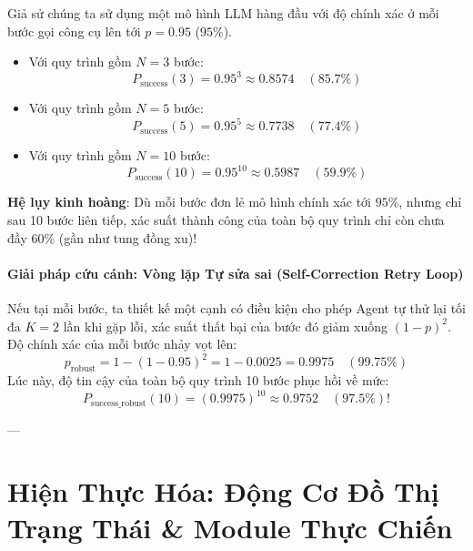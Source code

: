 \begin{example}
Giả sử chúng ta sử dụng một mô hình LLM hàng đầu với độ chính xác ở mỗi bước gọi công cụ lên tới $p = 0.95$ ($95\%$).
\begin{itemize}
  \item Với quy trình gồm $N = 3$ bước:
  \begin{equation*}
  P_{\text{success}}(3) = 0.95^3 \approx 0.8574 \quad (\mathbf{85.7\%})
  \end{equation*}
  \item Với quy trình gồm $N = 5$ bước:
  \begin{equation*}
  P_{\text{success}}(5) = 0.95^5 \approx 0.7738 \quad (\mathbf{77.4\%})
  \end{equation*}
  \item Với quy trình gồm $N = 10$ bước:
  \begin{equation*}
  P_{\text{success}}(10) = 0.95^{10} \approx 0.5987 \quad (\mathbf{59.9\%})
  \end{equation*}
\end{itemize}
\textbf{Hệ lụy kinh hoàng}: Dù mỗi bước đơn lẻ mô hình chính xác tới $95\%$, nhưng chỉ sau 10 bước liên tiếp, xác suất thành công của toàn bộ quy trình chỉ còn chưa đầy $60\%$ (gần như tung đồng xu)!

\paragraph{Giải pháp cứu cánh: Vòng lặp Tự sửa sai (Self-Correction Retry Loop)}
Nếu tại mỗi bước, ta thiết kế một cạnh có điều kiện cho phép Agent tự thử lại tối đa $K = 2$ lần khi gặp lỗi, xác suất thất bại của bước đó giảm xuống $(1 - p)^2$.
Độ chính xác của mỗi bước nhảy vọt lên:
\begin{equation*}
p_{\text{robust}} = 1 - (1 - 0.95)^2 = 1 - 0.0025 = 0.9975 \quad (99.75\%)
\end{equation*}
Lúc này, độ tin cậy của toàn bộ quy trình 10 bước phục hồi về mức:
\begin{equation*}
P_{\text{success\_robust}}(10) = (0.9975)^{10} \approx 0.9752 \quad (\mathbf{97.5\%})!
\end{equation*}
\end{example}

---

\section{Hiện Thực Hóa: Động Cơ Đồ Thị Trạng Thái \& Module Thực Chiến}
\label{sec:python-state-graph-engine}


